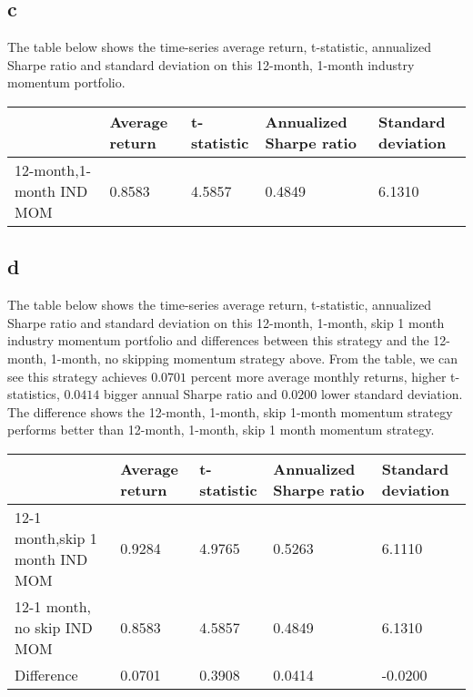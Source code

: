 \documentclass{report}
\begin{document}
\subsection{c}
The table below shows the time-series average return, t-statistic, annualized Sharpe ratio and standard deviation on this 12-month, 1-month industry momentum portfolio.
\begin{table}[H]
\begin{tabular}{|l|l|l|l|l|}
\hline
                        & Average return & t-statistic & Annualized Sharpe ratio & Standard deviation \\ \hline
12-month,1-month IND MOM & 0.8583         & 4.5857   & 0.4849               & 6.1310            \\ \hline
\end{tabular}
\end{table}

\subsection{d}
The table below shows the time-series average return, t-statistic, annualized Sharpe ratio and standard deviation on this 12-month, 1-month, skip 1 month industry momentum portfolio and differences between this strategy and the 12-month, 1-month, no skipping momentum strategy above. From the table, we can see this strategy achieves $0.0701$ percent more average monthly returns, higher t-statistics, $0.0414$ bigger annual Sharpe ratio and $0.0200$ lower standard deviation. The difference shows the 12-month, 1-month, skip 1-month momentum strategy performs better than 12-month, 1-month, skip 1 month momentum strategy.
\begin{table}[H]
\begin{tabular}{|l|l|l|l|l|}
\hline
                        & Average return & t-statistic & Annualized Sharpe ratio & Standard deviation \\ \hline
12-1 month,skip 1 month IND MOM & 0.9284        & 4.9765     & 0.5263               & 6.1110             \\ \hline
12-1 month, no skip IND MOM & 0.8583         & 4.5857   & 0.4849               & 6.1310            \\ \hline
Difference & 0.0701         & 0.3908   & 0.0414         & -0.0200            \\ \hline
\end{tabular}
\end{table}
\end{document}
